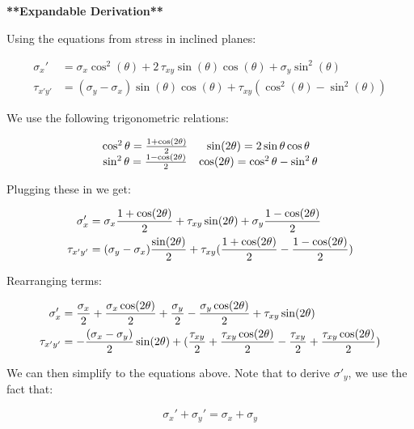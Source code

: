 \noindent \textbf{**Expandable Derivation**}

\vspace{5pt}

\noindent Using the equations from stress in inclined planes:

\[\begin{align}
\sigma_{x}' &= \sigma_{x} \cos ^2(\theta) + 2 \,\tau_{xy} \sin(\theta) \cos(\theta)+\sigma_{y} \sin ^2(\theta) \\
\tau_{x'y'} &= (\sigma_{y} - \sigma_{x}) \sin(\theta) \cos(\theta) + \tau_{xy} ( \cos^2(\theta) - \sin^2(\theta) )
\end{align}\]
                    
\noindent We use the following trigonometric relations:

\[\begin{matrix}
\rm\cos^2\theta = \frac{1 + \rm\cos(2\theta)}{2} & \rm\sin(2\theta) = 2\rm\sin\theta\rm\cos\theta \\
\rm\sin^2\theta = \frac{1 - \rm\cos(2\theta)}{2} & \rm\cos(2\theta) = \rm\cos^2\theta - \rm\sin^2\theta
\end{matrix}\]

\noindent Plugging these in we get:

\[\begin{align}
\sigma_{x}' &= \sigma_{x} \frac{1 + \rm\cos(2\theta)}{2} + \tau_{xy} \sin(2\theta) + \sigma_{y} \frac{1 - \rm\cos(2\theta)}{2} \\
\tau_{x'y'} &= (\sigma_{y} - \sigma_{x}) \frac{\sin(2\theta)}{2} + \tau_{xy} (\frac{1 + \rm\cos(2\theta)}{2} - \frac{1 - \rm\cos(2\theta)}{2})
\end{align}\]

\noindent Rearranging terms:

\[\begin{align}
\sigma_{x}' &= \frac{\sigma_{x}}{2} + \frac{\sigma_{x}\rm\cos(2\theta)}{2} + \frac{\sigma_{y}}{2} - \frac{\sigma_{y}\rm\cos(2\theta)}{2} + \tau_{xy}\sin(2\theta) \\
\tau_{x'y'} &= -\frac{(\sigma_{x} - \sigma_{y})}{2}\sin(2\theta) + (\frac{\tau_{xy}}{2} + \frac{\tau_{xy}\rm\cos(2\theta)}{2} - \frac{\tau_{xy}}{2} + \frac{\tau_{xy}\rm\cos(2\theta)}{2})
\end{align}\]

\noindent We can then simplify to the equations above. Note that to derive $\sigma '_y$, we use the fact that:

\[\sigma_{x}' + \sigma_{y}' = \sigma_{x} + \sigma_{y}\]

